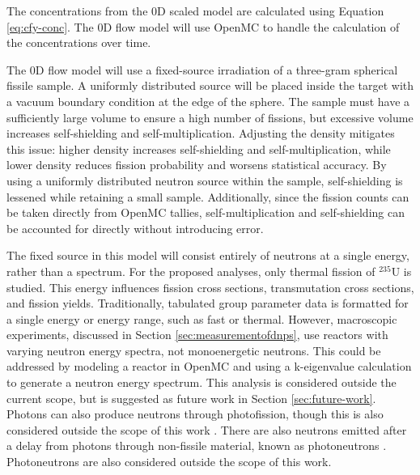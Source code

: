 The concentrations from the 0D scaled model are calculated using Equation \ref{eq:cfy-conc}.
The 0D flow model will use OpenMC to handle the calculation of the concentrations over time.

The 0D flow model will use a fixed-source irradiation of a three-gram spherical fissile sample.
A uniformly distributed source will be placed inside the target with a vacuum boundary condition at the edge of the sphere.
The sample must have a sufficiently large volume to ensure a high number of fissions, but excessive volume increases self-shielding and self-multiplication.
Adjusting the density mitigates this issue: higher density increases self-shielding and self-multiplication, while lower density reduces fission probability and worsens statistical accuracy.
By using a uniformly distributed neutron source within the sample, self-shielding is lessened while retaining a small sample.
Additionally, since the fission counts can be taken directly from OpenMC tallies, self-multiplication and self-shielding can be accounted for directly without introducing error.

The fixed source in this model will consist entirely of neutrons at a single energy, rather than a spectrum.
For the proposed analyses, only thermal fission of $^{235}$U is studied.
This energy influences fission cross sections, transmutation cross sections, and fission yields.
Traditionally, tabulated group parameter data is formatted for a single energy or energy range, such as fast or thermal.
However, macroscopic experiments, discussed in Section \ref{sec:measurementofdnps}, use reactors with varying neutron energy spectra, not monoenergetic neutrons.
This could be addressed by modeling a reactor in OpenMC and using a k-eigenvalue calculation to generate a neutron energy spectrum.
This analysis is considered outside the current scope, but is suggested as future work in Section \ref{sec:future-work}.
Photons can also produce neutrons through photofission, though this is also considered outside the scope of this work \cite{kinlaw2007delayed}.
There are also neutrons emitted after a delay from photons through non-fissile material, known as photoneutrons \cite{keckler2021photoneutron}.
Photoneutrons are also considered outside the scope of this work.

